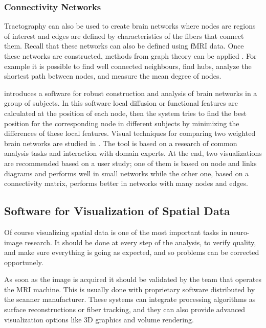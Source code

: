 \subsubsection{Connectivity Networks}

Tractography can also be used to create brain networks where nodes are regions of interest and edges are defined by characteristics of the fibers that connect them. Recall that these networks can also be defined using fMRI data. Once these networks are constructed, methods from graph theory can be applied \autocite{rubinov_complex_2010}. For example it is possible to find well connected neighbours, find hubs, analyze the shortest path between nodes, and measure the mean degree of nodes.

\autocite{li_visual_2012} introduces a software for robust construction and analysis of brain networks in a group of subjects. In this software local diffusion or functional features are calculated at the position of each node, then the system tries to find the best position for the corresponding node in different subjects by minimizing the differences of these local features.
Visual techniques for comparing two weighted brain networks are studied in \autocite{alper_weighted_2013}. The tool is based on a research of common analysis tasks and interaction with domain experts. At the end, two visualizations are recommended based on a user study; one of them is based on node and links diagrams and performs well in small networks while the other one, based on a connectivity matrix, performs better in networks with many nodes and edges.


\subsection{Software for Visualization of Spatial Data}

Of course visualizing spatial data is one of the most important tasks in neuro-image research. It should be done at every step of the analysis, to verify quality, and make sure everything is going as expected, and so problems can be corrected opportunely.

As soon as the image is acquired it should be validated by the team that operates the MRI machine. This is usually done with proprietary software distributed by the scanner manufacturer. These systems can integrate processing algorithms as surface reconstructions or fiber tracking, and they can also provide advanced visualization options like 3D graphics and volume rendering.

